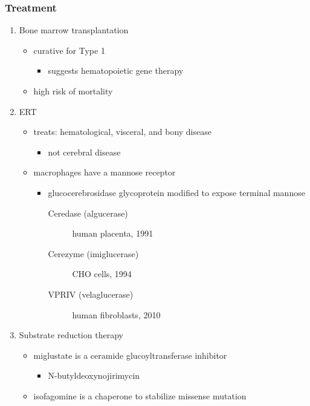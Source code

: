 \documentclass[12pt]{scrartcl}
\begin{document}
\subsubsection{Treatment}
\label{sec:orgdad77f7}
\begin{enumerate}
\item Bone marrow transplantation
\label{sec:orgca8ad67}
\begin{itemize}
\item curative for Type 1
\begin{itemize}
\item suggests hematopoietic gene therapy
\end{itemize}
\item high risk of mortality
\end{itemize}
\item ERT
\label{sec:org3ccde95}
\begin{itemize}
\item treats: hematological, visceral, and bony disease
\begin{itemize}
\item not cerebral disease
\end{itemize}
\item macrophages have a mannose receptor
\begin{itemize}
\item glucocerebrosidase glycoprotein modified to expose terminal mannose
\begin{description}
\item[{Ceredase (algucerase)}] human placenta, 1991
\item[{Cerezyme (imiglucerase)}] CHO cells, 1994
\item[{VPRIV (velaglucerase)}] human fibroblasts, 2010
\end{description}
\end{itemize}
\end{itemize}

\item Substrate reduction therapy
\label{sec:org6942d06}
\begin{itemize}
\item miglustate is a ceramide glucoyltransferase inhibitor
\begin{itemize}
\item N-butyldeoxynojirimycin
\end{itemize}
\item isofagomine is a chaperone to stabilize missense mutation
\end{itemize}
\end{enumerate}
\end{document}
